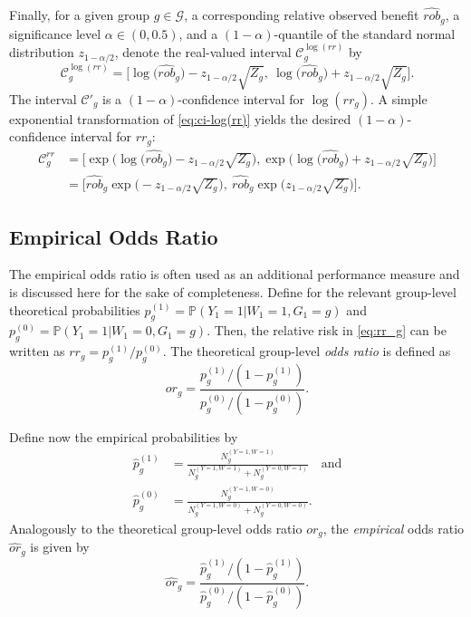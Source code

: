 \documentclass[11pt]{article}
\begin{document}
Finally, for a given group $g \in \mathcal{G}$, a corresponding relative observed benefit $\widehat{rob}_g$, a significance level $\alpha \in (0,0.5)$, and a $(1-\alpha)$-quantile of the standard normal distribution $z_{1-\alpha / 2}$, denote the real-valued interval $\mathcal{C}^{\log(rr)}_g$ by 
\begin{equation}
    \mathcal{C}^{\log(rr)}_g
    =
    \Big[
    \log \big( \widehat{rob}_g\big) - z_{1-\alpha / 2} \sqrt{Z_g},\ 
    \log \big( \widehat{rob}_g\big) + z_{1-\alpha / 2} \sqrt{Z_g}
    \Big].
\label{eq:ci-log(rr)}
\end{equation}
The interval $\mathcal{C}'_g$ is a $(1-\alpha)$-confidence interval for $\log(rr_g)$. A simple exponential transformation of \eqref{eq:ci-log(rr)} yields the desired $(1-\alpha)$-confidence interval for $rr_g$:
\begin{equation}
\begin{split}
    \mathcal{C}_g^{rr}
    &=
    \Bigg[ 
    \exp\Big( \log \big( \widehat{rob}_g\big) - z_{1-\alpha / 2} \sqrt{Z_g} \Big),
    \exp\Big( \log \big( \widehat{rob}_g\big) + z_{1-\alpha / 2} \sqrt{Z_g} \Big)
    \Bigg]
    \\
    &=
   \Bigg[ 
   \widehat{rob}_g 
   \exp \Big(
   - z_{1-\alpha / 2} \sqrt{Z_g} \Big),\ 
   \widehat{rob}_g 
   \exp \Big(
    z_{1-\alpha / 2} \sqrt{Z_g} \Big)
    \Bigg].
\end{split}
\end{equation}

\subsection{Empirical Odds Ratio}
The empirical odds ratio is often used as an additional performance measure and is discussed here for the sake of completeness. 
Define for the relevant group-level theoretical probabilities $p_g^{(1)} = \mathbb{P}(Y_1 = 1 | W_1 = 1, G_1 = g)$ and $p_g^{(0)} = \mathbb{P}(Y_1 = 1 | W_1 = 0, G_1 = g)$. Then, the relative risk in \eqref{eq:rr_g} can be written as $rr_g = p_g^{(1)} / p_g^{(0)}$. The theoretical group-level \textit{odds ratio} is defined as
\begin{equation}
    or_g = \frac{p_g^{(1)} / (1 - p_g^{(1)})}{p_g^{(0)} / (1 - p_g^{(0)})}.
\end{equation}

Define now the empirical probabilities by 
\begin{align*}
\hat{p}_g^{(1)} &= \frac{N_g^{(Y=1,W=1)}}{N_g^{(Y=1,W=1)} + N_g^{(Y=0,W=1)}} \quad \text{and}
\\
\hat{p}_g^{(0)} &= \frac{N_g^{(Y=1,W=0)}}{N_g^{(Y=1,W=0)} + N_g^{(Y=0,W=0)}}.
\end{align*}
Analogously to the theoretical group-level odds ratio $or_g$, the \textit{empirical} odds ratio $\widehat{or}_g$ is given by
\begin{equation}
    \widehat{or}_g = \frac{\hat{p}_g^{(1)} / (1 - \hat{p}_g^{(1)})}{\hat{p}_g^{(0)} / (1 - \hat{p}_g^{(0)})}.
\end{equation}
\end{document}
